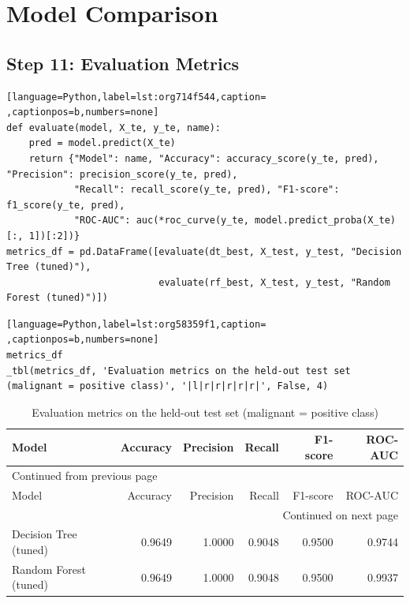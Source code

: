 \documentclass[11pt]{article}
\begin{document}
\section*{Model Comparison}
\label{sec:org300e416}


\subsection*{Step 11: Evaluation Metrics}
\label{sec:org5dee395}

\begin{lstlisting}[language=Python,label=lst:org714f544,caption= ,captionpos=b,numbers=none]
def evaluate(model, X_te, y_te, name):
    pred = model.predict(X_te)
    return {"Model": name, "Accuracy": accuracy_score(y_te, pred), "Precision": precision_score(y_te, pred),
            "Recall": recall_score(y_te, pred), "F1-score": f1_score(y_te, pred),
            "ROC-AUC": auc(*roc_curve(y_te, model.predict_proba(X_te)[:, 1])[:2])}
metrics_df = pd.DataFrame([evaluate(dt_best, X_test, y_test, "Decision Tree (tuned)"),
                           evaluate(rf_best, X_test, y_test, "Random Forest (tuned)")])
\end{lstlisting}

\begin{lstlisting}[language=Python,label=lst:org58359f1,caption= ,captionpos=b,numbers=none]
metrics_df
_tbl(metrics_df, 'Evaluation metrics on the held-out test set (malignant = positive class)', '|l|r|r|r|r|r|', False, 4)
\end{lstlisting}

\begin{longtable}{|l|r|r|r|r|r|}
\caption{Evaluation metrics on the held-out test set (malignant = positive class)}
\\[0pt]
\hline
Model & Accuracy & Precision & Recall & F1-score & ROC-AUC\\[0pt]
\hline
\endfirsthead
\multicolumn{6}{l}{Continued from previous page} \\[0pt]
\hline

Model & Accuracy & Precision & Recall & F1-score & ROC-AUC \\[0pt]

\hline
\endhead
\hline\multicolumn{6}{r}{Continued on next page} \\
\endfoot
\endlastfoot
\hline
Decision Tree (tuned) & 0.9649 & 1.0000 & 0.9048 & 0.9500 & 0.9744\\[0pt]
\hline
Random Forest (tuned) & 0.9649 & 1.0000 & 0.9048 & 0.9500 & 0.9937\\[0pt]
\hline
\end{longtable}
\end{document}
